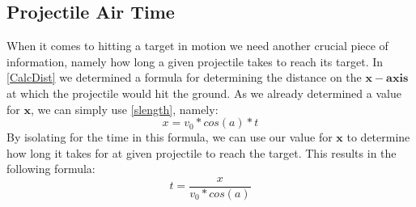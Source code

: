 \subsection{Projectile Air Time}
When it comes to hitting a target in motion we need another crucial piece of information,
namely how long a given projectile takes to reach its target.
In \autoref{CalcDist} we determined a formula for determining the distance on
the $\mathbf{x-axis}$ at which the projectile would hit the ground. As we
already determined a value for $\mathbf{x}$, we can simply use
\autoref{slength}, namely:
\begin{equation}
x=v_0*cos(a)*t
\end{equation}
By isolating for the time in this formula, we can use our value for $\mathbf{x}$
to determine how long it takes for at given projectile to reach the target. This
results in the following formula:
\begin{equation}\label{TimeEq}
t=\frac{x}{v_0*cos(a)}
\end{equation}

% 
% 
% 


